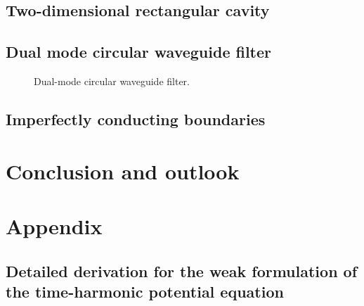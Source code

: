 \documentclass[11pt, a4paper]{article}
\begin{document}
\subsection{Two-dimensional rectangular cavity}
\label{subsec:examples-rectangularcavity}






\subsection{Dual mode circular waveguide filter}
\label{subsec:examples-dmcwf}


\begin{figure}[h]
    \centering
    
    \caption{Dual-mode circular waveguide filter.}
    \label{fig:DMCWF}
\end{figure}




\subsection{Imperfectly conducting boundaries}
\label{subsec:examples-impedance}


\pagebreak
\section{Conclusion and outlook}
\label{sec:conclusion}


\pagebreak
\section{Appendix}
\label{sec:appendix}

\subsection{Detailed derivation for the weak formulation of the time-harmonic potential equation}
\label{subsec:derivation}
\end{document}

